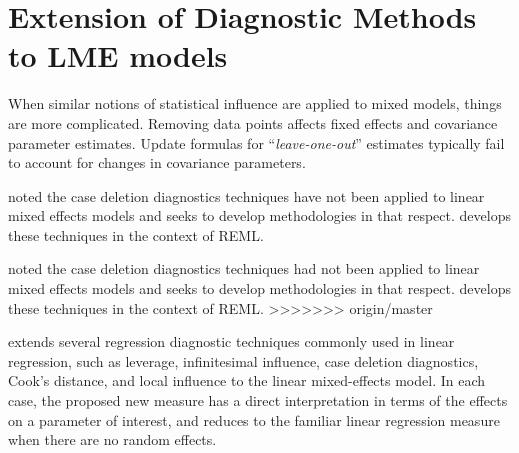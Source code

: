 \documentclass[12pt, a4paper]{report}
\theoremstyle{plain}
\theoremstyle{definition}
\theoremstyle{remark}
\begin{document}
\section{Extension of Diagnostic Methods to LME models}


When similar notions of statistical influence are applied to mixed models,
things are more complicated. Removing data points affects fixed effects and covariance parameter estimates.
Update formulas for “\textit{leave-one-out}” estimates typically fail to account for changes in covariance
parameters. 
%
%

\citet{Christiansen} noted the case deletion diagnostics techniques have not been applied to linear mixed effects models and seeks to develop methodologies in that respect. \citet{Christiansen} develops these techniques in the context of REML.

\citet{CPJ} noted the case deletion diagnostics techniques had not been applied to linear mixed effects models and seeks to develop methodologies in that respect. \citet{CPJ} develops these techniques in the context of REML.
>>>>>>> origin/master



\citet{Demi} extends several regression diagnostic techniques commonly used in linear regression, such as leverage, infinitesimal influence, case deletion diagnostics, Cook's distance, and local influence to the linear mixed-effects model. In each case, the proposed new measure has a direct interpretation in terms of the effects on a parameter of interest, and reduces to the familiar linear regression measure when there are no random effects. 
\end{document}
